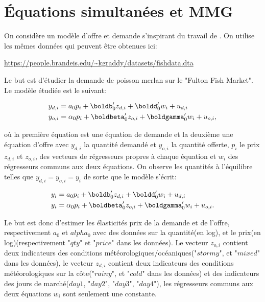 \section{Équations simultanées et MMG}

On considère un modèle d'offre et demande s'inspirant du travail de \cite{AGI_RES_2000}. 
On utilise les mêmes données qui peuvent être obtenues ici:

\medskip

\url{https://people.brandeis.edu/~kgraddy/datasets/fishdata.dta}

\medskip

Le but est d'étudier la demande de poisson merlan sur le "Fulton Fish Market". 
Le modèle étudiée est le suivant:

\begin{align*}
	y_{d, i} & = a_0 p_i + \boldb_0^\prime z_{d, i} +  \boldd_0^\prime w_i + u_{d, i}\\
	y_{o, i} & = \alpha_0 p_i + \boldbeta_0^\prime z_{o, i} + \boldgamma_0^\prime w_i + u_{o, i},
\end{align*}

où la première équation est une équation de demande et la deuxième une équation d'offre avec $y_{d, i}$ la quantité demandé
et $y_{o, i}$ la quantité offerte, $p_i$ le prix $z_{d, i}$ et $z_{o, i}$, des 
vecteurs de régresseurs propres à chaque équation et $w_i$ des régresseurs communs aux deux équations.
On observe les quantités à l'équilibre telles que $y_{d, i} = y_{o, i} = y_i$ de sorte que le modèle
s'écrit:

\begin{align*}
	y_i & = a_0 p_i + \boldb_0^\prime z_{d, i} +  \boldd_0^\prime w_i + u_{d, i}\\
	y_i & = \alpha_0 p_i + \boldbeta_0^\prime z_{o, i} + \boldgamma_0^\prime w_i + u_{o, i}.
\end{align*}

Le but est donc d'estimer les élasticités prix de la demande et de l'offre, respectivement $a_0$ et $alpha_0$ avec des
 données sur la quantité(en log), et le prix(en log)(respectivement "$qty$" et "$price$" dans les données).
Le vecteur $z_{o, i}$ contient deux indicateurs des conditions météorologiques/océaniques("$stormy$", et "$mixed$" 
dans les données), le vecteur $z_{d, i}$ contient deux indicateurs des conditions météorologiques 
sur la côte("$rainy$", et "$cold$" dans les données) et des indicateurs des jours de marché($day1$, "$day2$", 
"$day3$", "$day4$"), les régresseurs communs aux deux équations $w_i$ sont seulement une constante.

